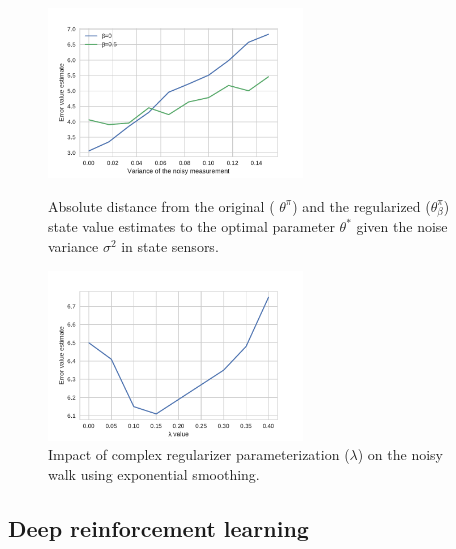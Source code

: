 \documentclass{article}
\newcommand{\param}{\beta}
\begin{document}
\begin{figure}
\begin{minipage}[c]{0.45\linewidth}
\centering
\includegraphics[height=4.5cm,width=\linewidth]{noisy_walk.pdf}
\caption{Absolute distance from the original ( $\theta^\pi$) and the regularized ($\theta^\pi_\param$) state value estimates to the optimal parameter $\theta^*$ given the noise variance $\sigma^2$ in state sensors.}
\label{fig:perf_MDP_noisy}
\end{minipage}
\hfill
\begin{minipage}[c]{0.45\linewidth}
\centering
\includegraphics[height=4.5cm,width=\linewidth]{error_noisy.pdf}
\caption{Impact of complex regularizer parameterization ($\lambda$) on the noisy walk using exponential smoothing.}
\label{fig:smoothing}
\end{minipage}%
\end{figure}

\subsection{Deep reinforcement learning}
\label{sec:expe:drl}
\end{document}
